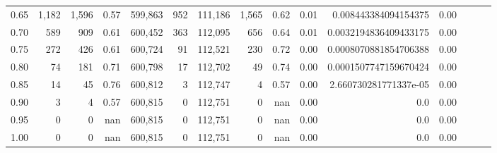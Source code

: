 \begin{tabular}{rrrrrrrrrrrrrrr}
0.65 &    1,182 &   1,596 &  0.57 &  599,863 &      952 &  111,186 &    1,565 &  0.62 &  0.01 &   0.008443384094154375 &      0.00 \\
0.70 &      589 &     909 &  0.61 &  600,452 &      363 &  112,095 &      656 &  0.64 &  0.01 &  0.0032194836409433175 &      0.00 \\
0.75 &      272 &     426 &  0.61 &  600,724 &       91 &  112,521 &      230 &  0.72 &  0.00 &  0.0008070881854706388 &      0.00 \\
0.80 &       74 &     181 &  0.71 &  600,798 &       17 &  112,702 &       49 &  0.74 &  0.00 &  0.0001507747159670424 &      0.00 \\
0.85 &       14 &      45 &  0.76 &  600,812 &        3 &  112,747 &        4 &  0.57 &  0.00 &  2.660730281771337e-05 &      0.00 \\
0.90 &        3 &       4 &  0.57 &  600,815 &        0 &  112,751 &        0 &   nan &  0.00 &                    0.0 &      0.00 \\
0.95 &        0 &       0 &   nan &  600,815 &        0 &  112,751 &        0 &   nan &  0.00 &                    0.0 &      0.00 \\
1.00 &        0 &       0 &   nan &  600,815 &        0 &  112,751 &        0 &   nan &  0.00 &                    0.0 &      0.00 \\
\bottomrule
\end{tabular}
